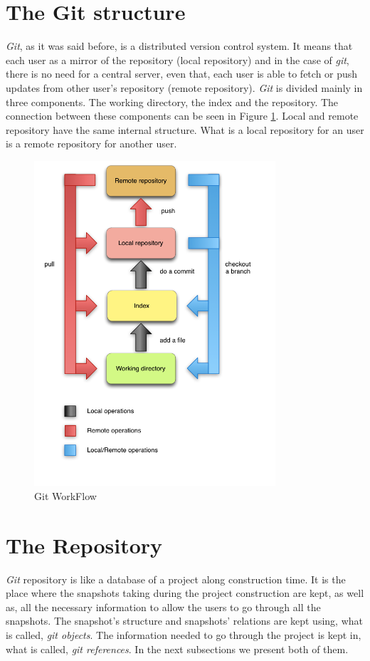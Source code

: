 \section{The Git structure}
\emph{Git}, as it was said before, is a distributed version control system.
It means that each user as a mirror of the repository (local
repository) and in the case of
\emph{git}, there is no need for a central server, even that, each user is able to
fetch or push updates from other user's repository (remote repository).
\emph{Git} is divided mainly in three components. The working directory,
the index and the repository. The connection between these components
can be seen in Figure \ref{fig:git_structure}. Local and remote
repository have the same internal structure. What is a local
repository for an user is a remote repository for another user.

\begin{figure}[!t]
   \centering
   \includegraphics[width=0.8\textwidth]{images/git_workflow.png}
   \caption{Git WorkFlow}\label{fig:git_structure}
\end{figure}

\pagebreak

\section{The Repository}
\emph{Git} repository is like a database of a project along construction time. It is
the place where the snapshots taking during the project construction
are kept, as well as, all the necessary information to
allow the users to go through all the snapshots. The snapshot's
structure and snapshots' relations are kept using, what is called, \emph{git
objects}. The information needed to go through the project is kept in,
what is called, \emph{git references}. In the next subsections we
present both of them.


